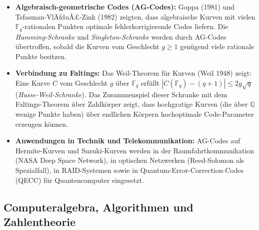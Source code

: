 ﻿\documentclass[12pt,a4paper]{article}
\theoremstyle{plain}
\theoremstyle{definition}
\theoremstyle{remark}
\newcommand{\Q}{\mathbb{Q}}
\newcommand{\F}{\mathbb{F}}
\begin{document}
\begin{itemize}[leftmargin=2em,itemsep=4pt]
  \item \textbf{Algebraisch-geometrische Codes (AG-Codes):}
    Goppa (1981) und Tsfasman-VlÄƒduÅ£-Zink (1982) zeigten, dass algebraische Kurven
    mit vielen $\F_q$-rationalen Punkten optimale fehlerkorrigierende Codes liefern.
    Die \emph{Hamming-Schranke} und \emph{Singleton-Schranke} werden durch
    AG-Codes übertroffen, sobald die Kurven vom Geschlecht $g \geq 1$ genügend
    viele rationale Punkte besitzen.

  \item \textbf{Verbindung zu Faltings:}
    Das Weil-Theorem für Kurven (Weil 1948) zeigt: Eine Kurve $C$ vom Geschlecht $g$
    über $\F_q$ erfüllt $|C(\F_q) - (q+1)| \leq 2g\sqrt{q}$ (\emph{Hasse-Weil-Schranke}).
    Das Zusammenspiel dieser Schranke mit dem Faltings-Theorem über Zahlkörper
    zeigt, dass hochgratige Kurven (die über $\Q$ wenige Punkte haben)
    über endlichen Körpern hochoptimale Code-Parameter erzeugen können.

  \item \textbf{Anwendungen in Technik und Telekommunikation:}
    AG-Codes auf Hermite-Kurven und Suzuki-Kurven werden in der
    Raumfahrtkommunikation (NASA Deep Space Network), in optischen Netzwerken
    (Reed-Solomon als Spezialfall), in RAID-Systemen sowie in Quantum-Error-Correction-Codes
    (QECC) für Quantencomputer eingesetzt.
\end{itemize}

\subsection{Computeralgebra, Algorithmen und Zahlentheorie}
\end{document}
